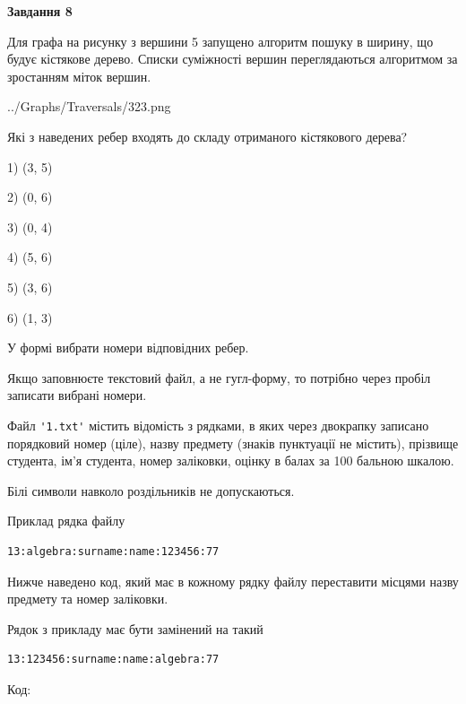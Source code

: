 \documentclass[12pt, ukrainian]{article}
\def\code#1{\Verb!#1!}
\begin{document}
{\begin {large}
{\begin {center}\textbf{Завдання 8}\end {center}}\par
Для графа на рисунку з вершини 5 запущено алгоритм пошуку в ширину, що будує кістякове дерево. Списки суміжності вершин переглядаються алгоритмом за зростанням міток вершин.\par
\begin{center}
	{../Graphs/Traversals/323.png}
\end{center}
\par Які з наведених ребер входять до складу отриманого кістякового дерева?\par
1) (3, 5)\par
2) (0, 6)\par
3) (0, 4)\par
4) (5, 6)\par
5) (3, 6)\par
6) (1, 3)\par
{\vskip 15pt} У формі вибрати номери відповідних ребер.


Якщо заповнюєте текстовий файл, а не гугл-форму, то потрібно через пробіл записа\-ти вибрані номери.\par
\newpage


Файл \code{'1.txt'} містить відомість з рядками, в яких через двокрапку записано поряд\-ковий номер (ціле), назву предмету (знаків пунктуації не містить), прізвище студента, ім'я студента, номер заліковки, оцінку в балах за 100 бальною шкалою.

Білі символи навколо роздільників не допускаються.

Приклад рядка файлу



\begin{verbatim}
13:algebra:surname:name:123456:77
\end{verbatim}


Нижче наведено код, який має в кожному рядку файлу переставити місцями назву предмету та номер заліковки.

Рядок з прикладу має бути замінений на такий



\begin{verbatim}
13:123456:surname:name:algebra:77
\end{verbatim}




Код:




\end{large}}
\end{document}
